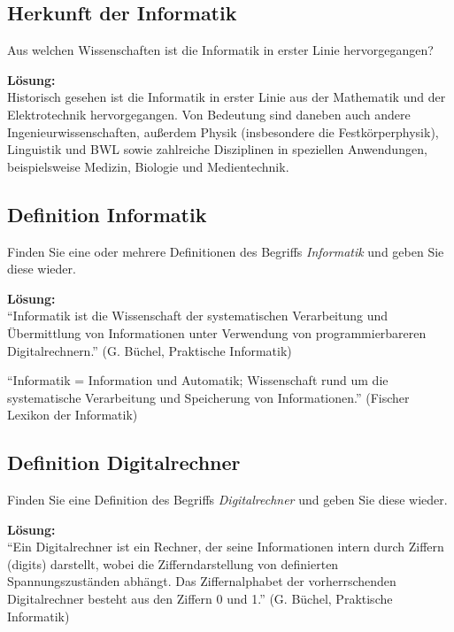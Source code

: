 \documentclass[11pt,a4paper,DIV=12]{scrartcl}
\date{\today}
\author{Peter Mustermann\\ (1992822)}
\newcommand{\loesung}{\textbf{Lösung:}\\}
\begin{document}
\maketitle       %

\subsection{Herkunft der Informatik}

Aus welchen Wissenschaften ist die Informatik in erster Linie hervorgegangen?

\loesung
Historisch gesehen ist die Informatik in erster Linie aus der Mathematik und der Elektrotechnik hervorgegangen. Von Bedeutung sind daneben auch andere Ingenieurwissenschaften, außerdem Physik (insbesondere die Festkörperphysik), Linguistik und BWL sowie zahlreiche Disziplinen in speziellen Anwendungen, beispielsweise Medizin, Biologie und Medientechnik.

\subsection{Definition Informatik}
Finden Sie eine oder mehrere Definitionen des Begriffs \emph{Informatik} und geben Sie diese wieder.

\loesung
\enquote{Informatik ist die Wissenschaft der systematischen Verarbeitung und
Übermittlung von Informationen unter Verwendung von
programmierbareren Digitalrechnern.} (G. Büchel, Praktische Informatik)

\enquote{Informatik = Information und Automatik; Wissenschaft rund um die systematische Verarbeitung und Speicherung von Informationen.} (Fischer Lexikon der Informatik)

\subsection{Definition Digitalrechner}
Finden Sie eine Definition des Begriffs \emph{Digitalrechner} und geben Sie diese wieder.

\loesung
\enquote{Ein Digitalrechner ist ein Rechner, der seine Informationen intern durch Ziffern (digits) darstellt, wobei die Zifferndarstellung von definierten Spannungszuständen abhängt. Das Ziffernalphabet der vorherrschenden Digitalrechner besteht aus den Ziffern 0 und 1.} (G. Büchel, Praktische Informatik)
\end{document}
